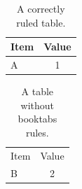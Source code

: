\documentclass{article}
\begin{document}
\begin{table}[t]
\centering
\caption{A correctly ruled table.}
\label{tab:good}
\begin{tabular}{lc}
\toprule
Item & Value \\
\midrule
A & 1 \\
\bottomrule
\end{tabular}
\end{table}

\begin{table}[t]
\centering
\caption{A table without booktabs rules.}
\label{tab:bad}
\begin{tabular}{lc}
Item & Value \\
B & 2 \\
\end{tabular}
\end{table}
\end{document}
